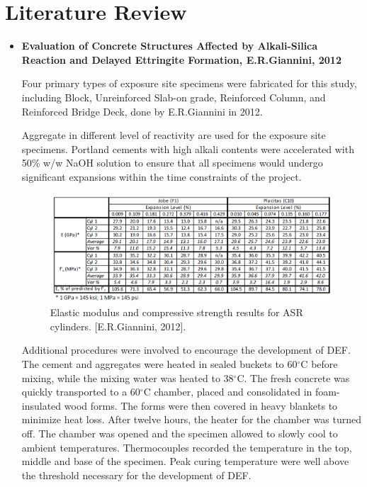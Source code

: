 \section{Literature Review}

\begin{itemize}

    \item
    \textbf{Evaluation of Concrete Structures Affected by Alkali-Silica Reaction and Delayed Ettringite Formation, E.R.Giannini, 2012}

    Four primary types of exposure site specimens were fabricated for this study, including Block, Unreinforced Slab-on grade, Reinforced Column, and Reinforced Bridge Deck, done by  E.R.Giannini in 2012\cite{GIANNINI}.

    Aggregate in different level of reactivity are used for the exposure site specimens. Portland cements with high alkali contents were accelerated with 50\% w/w NaOH solution to ensure that all specimens would undergo significant expansions within the time constraints of the project.

    \begin{figure}[ht!]
        \centering
        \includegraphics[width=.9\linewidth]{Files/Background/GIANNINI_ASR.png}
        \caption{Elastic modulus and compressive strength results for ASR cylinders. [E.R.Giannini, 2012].}
        \label{fig:GIANNINI_DEF}
    \end{figure}

    Additional procedures were involved to encourage the development of DEF. The cement and aggregates were heated in sealed buckets to 60$^\circ$C before mixing, while the mixing water was heated to 38$^\circ$C. The fresh concrete was quickly transported to a 60$^\circ$C chamber, placed and consolidated in foam-insulated wood forms. The forms were then covered in heavy blankets to minimize heat loss. After twelve hours, the heater for the chamber was turned off. The chamber was opened and the specimen allowed to slowly cool to ambient temperatures. Thermocouples recorded the temperature in the top, middle and base of the specimen. Peak curing temperature were well above the threshold necessary for the development of DEF.


\end{itemize}
